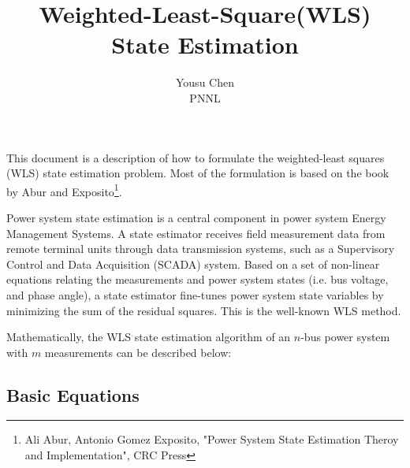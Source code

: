 \documentclass[12pt]{article}
\begin{document}
\title{Weighted-Least-Square(WLS) State Estimation}
\author{Yousu Chen \\PNNL}
\maketitle
This document is a description of how to formulate the weighted-least squares
(WLS) state estimation problem. Most of the formulation is based on the
book by Abur and Exposito\footnote{Ali Abur, Antonio Gomez Exposito, "Power
System State Estimation Theroy and Implementation", CRC Press }.

Power system state estimation is a central component in power system Energy
Management Systems. A state estimator receives field measurement data from
remote terminal units through data transmission systems, such as a Supervisory
Control and Data Acquisition (SCADA) system. Based on a set of non-linear
equations relating the measurements and power system states (i.e.  bus voltage,
and phase angle), a state estimator fine-tunes power system state variables by
minimizing the sum of the residual squares.  This is the well-known WLS method.

Mathematically, the WLS state estimation algorithm of an $n$-bus power system
with $m$ measurements can be described below:

\subsection*{Basic Equations}
\end{document}
